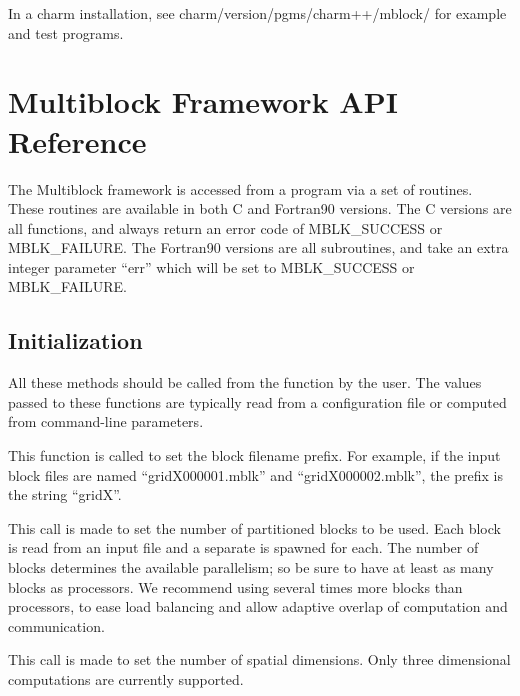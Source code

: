 \documentclass[10pt]{article}
\begin{document}
In a charm installation, see charm/version/pgms/charm++/mblock/
for example and test programs.


\section{Multiblock Framework API Reference}

The Multiblock framework is accessed from a program via a set of routines.
These routines are available in both C and Fortran90 versions.
The C versions are all functions, and always return an error code of 
MBLK\_SUCCESS or MBLK\_FAILURE.
The Fortran90 versions are all subroutines, and take an extra integer
parameter ``err'' which will be set to MBLK\_SUCCESS or MBLK\_FAILURE.

\subsection{Initialization}
All these methods should be called from the  function by the user. 
The values passed to these functions are typically read from a configuration 
file or computed from command-line parameters.

\vspace{0.2in}
This function is called to set the block filename prefix. 
For example, if the input block files are named ``gridX000001.mblk''
and ``gridX000002.mblk'', the prefix is the string ``gridX''.

\vspace{0.2in}
This call is made to set the number of partitioned blocks to be used.
Each block is read from an input file and a separate 
is spawned for each.  The number of blocks determines the available
parallelism; so be sure to have at least as many blocks as processors.
We recommend using several times more blocks than processors, to ease 
load balancing and allow adaptive overlap of computation and communication.

\vspace{0.2in}
This call is made to set the number of spatial dimensions. 
Only three dimensional computations are currently supported.
\end{document}
